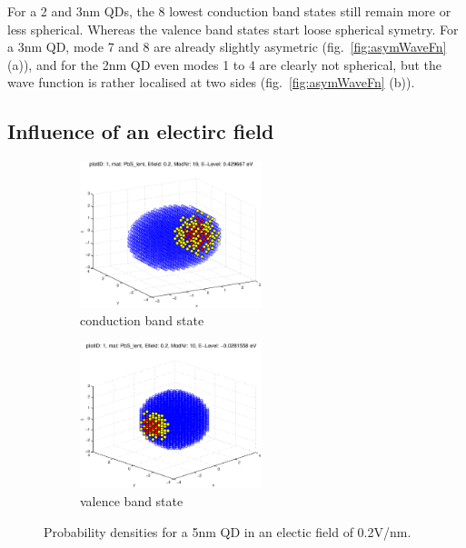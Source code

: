 	For a 2 and 3nm QDs, the 8 lowest conduction band states still remain more or less spherical. Whereas the valence band states start loose spherical symetry. For a 3nm QD, mode 7 and 8 are already slightly asymetric (fig.~\ref{fig:asymWaveFn} (a)), and for the 2nm QD even modes 1 to 4 are clearly not spherical, but the wave function is rather localised at two sides (fig.~\ref{fig:asymWaveFn} (b)).
	
	\FloatBarrier
\subsection{Influence of an electirc field}
\begin{figure}
	\centering
	\begin{subfigure}{200px}
		\includegraphics[width=200px]{Fig/Plots/r25v02CB}
		\caption{conduction band state}
	\end{subfigure}
	\begin{subfigure}{200px}
		\includegraphics[width=200px]{Fig/Plots/r25v02VB}
		\caption{valence band state}
	\end{subfigure}	
	\caption{Probability densities for a 5nm QD in an electic field of 0.2V/nm.}
	\label{fig:EfieldWaveFn}
\end{figure}
%
